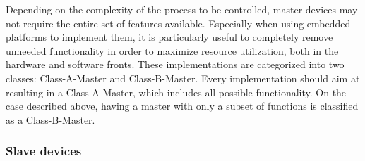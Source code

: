 Depending on the complexity of the process to be controlled, master devices may not require the entire set of features available.
Especially when using embedded platforms to implement them, it is particularly useful to completely remove unneeded functionality in order to maximize resource utilization, both in the hardware and software fronts.
These implementations are categorized into two classes: Class-A-Master and Class-B-Master.
Every implementation should aim at resulting in a Class-A-Master, which includes all possible functionality.
On the case described above, having a master with only a subset of functions is classified as a Class-B-Master.

\subsubsection{Slave devices}


